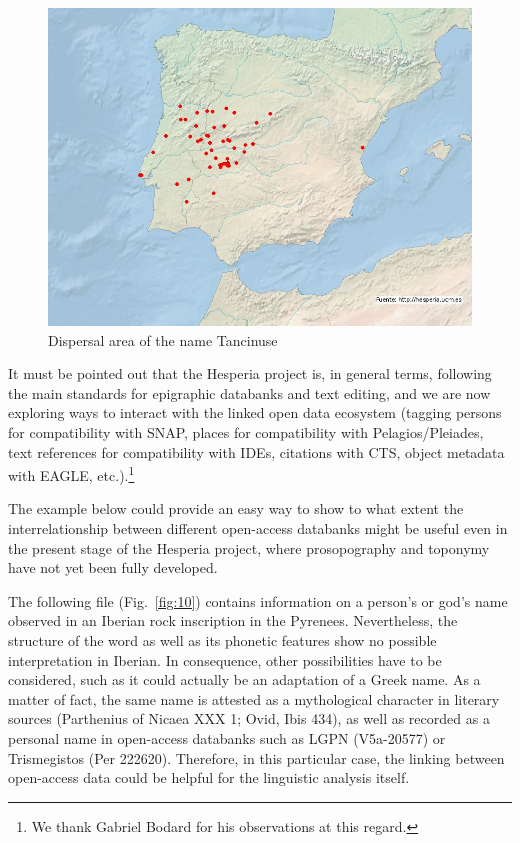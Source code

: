 \documentclass[amsthm,ebook]{saparticle}
\begin{document}
\begin{figure}[!hbp]
\centering
 \includegraphics[width=\columnwidth]{EpigraphyandonomasticsinHesperiadatabanktemplate-img009.jpg}
\caption{Dispersal area of the name Tancinuse}
\label{fig:9}
\end{figure}


It must be pointed out that the Hesperia project is, in general terms, following the main standards for epigraphic
databanks and text editing, and we are now exploring ways to interact with the linked open data ecosystem (tagging
persons for compatibility with SNAP, places for compatibility with Pelagios/Pleiades, text references for compatibility
with IDEs, citations with CTS, object metadata with EAGLE, etc.).\footnote{ We thank Gabriel Bodard for his
observations at this regard.} 

The example below could provide an easy way to show to what extent the interrelationship between different open-access
databanks might be useful even in the present stage of the Hesperia project, where prosopography and toponymy have not
yet been fully developed. 

The following file (Fig.~\ref{fig:10}) contains information on a person’s or god’s name observed in an Iberian rock inscription in the
Pyrenees. Nevertheless, the structure of the word as well as its phonetic features show no possible interpretation in
Iberian. In consequence, other possibilities have to be considered, such as it could actually be an adaptation of a
Greek name. As a matter of fact, the same name is attested as a mythological character in literary sources (Parthenius
of Nicaea XXX 1; Ovid, Ibis 434), as well as recorded as a personal name in open-access databanks such as LGPN
(V5a-20577) or Trismegistos (Per 222620). Therefore, in this particular case, the linking between open-access data
could be helpful for the linguistic analysis itself.
\end{document}
